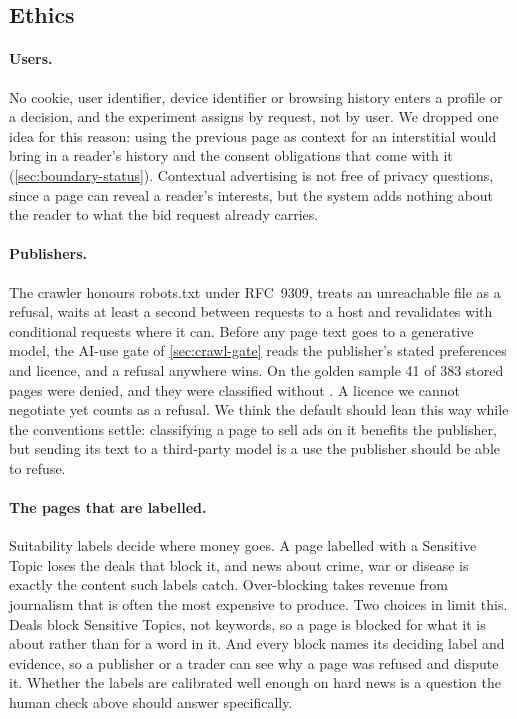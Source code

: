 \subsection{Ethics}\label{sec:discussion-ethics}

\paragraph{Users.} No cookie, user identifier, device identifier or browsing history enters a profile or a decision, and the experiment assigns by request, not by user. We dropped one idea for this reason: using the previous page as context for an interstitial would bring in a reader's history and the consent obligations that come with it (\cref{sec:boundary-status}). Contextual advertising is not free of privacy questions, since a page can reveal a reader's interests, but the system adds nothing about the reader to what the bid request already carries.

\paragraph{Publishers.} The crawler honours robots.txt under RFC~9309, treats an unreachable file as a refusal, waits at least a second between requests to a host and revalidates with conditional requests where it can. Before any page text goes to a generative model, the AI-use gate of \cref{sec:crawl-gate} reads the publisher's stated preferences and licence, and a refusal anywhere wins. On the golden sample 41 of 383 stored pages were denied, and they were classified without . A licence we cannot negotiate yet counts as a refusal. We think the default should lean this way while the conventions settle: classifying a page to sell ads on it benefits the publisher, but sending its text to a third-party model is a use the publisher should be able to refuse.

\paragraph{The pages that are labelled.} Suitability labels decide where money goes. A page labelled with a Sensitive Topic loses the deals that block it, and news about crime, war or disease is exactly the content such labels catch. Over-blocking takes revenue from journalism that is often the most expensive to produce. Two choices in \sys{} limit this. Deals block Sensitive Topics, not keywords, so a page is blocked for what it is about rather than for a word in it. And every block names its deciding label and evidence, so a publisher or a trader can see why a page was refused and dispute it. Whether the labels are calibrated well enough on hard news is a question the human check above should answer specifically.

